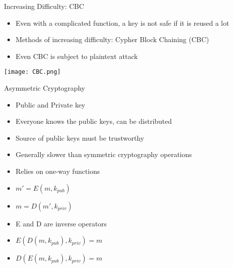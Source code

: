\begin{withoutheadline}
\begin{frame}{Increasing Difficulty: CBC}
    \begin{itemize}
        \item Even with a complicated function, a key is not safe if it is reused a lot
        \item Methods of increasing difficulty: Cypher Block Chaining (CBC)
        \item Even CBC is subject to plaintext attack
    \end{itemize}
    \texttt{[image: CBC.png]}
\end{frame}

\begin{frame}{Asymmetric Cryptography}
    \begin{itemize}
        \item Public and Private key
        \item Everyone knows the public keys, can be distributed
        \item Source of public keys must be trustworthy
        \item Generally slower than symmetric cryptography operations
        \item Relies on one-way functions
        \item $m' =E(m, k_{pub})$
        \item $m = D(m', k_{priv})$
        \item E and D are inverse operators
        \item $E(D(m, k_{pub}), k_{priv}) = m$
        \item $D(E(m, k_{pub}), k_{priv}) = m$
    \end{itemize}
\end{frame}


\end{withoutheadline}
